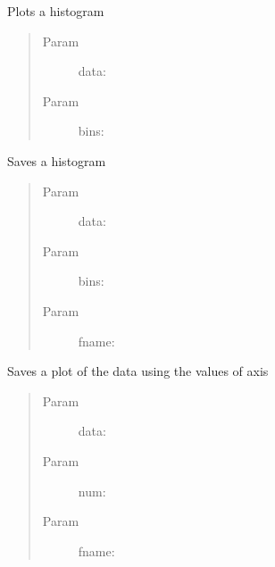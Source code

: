 \documentclass[letterpaper,10pt,english]{sphinxmanual}
\begin{document}

\begin{fulllineitems}
\label{index:SuperHubPlot.plotHisto}
Plots a histogram
\begin{quote}\begin{description}
\item[{Param }] \leavevmode
data:

\item[{Param }] \leavevmode
bins:

\end{description}\end{quote}

\end{fulllineitems}


\begin{fulllineitems}
\label{index:SuperHubPlot.saveHisto}
Saves a histogram
\begin{quote}\begin{description}
\item[{Param }] \leavevmode
data:

\item[{Param }] \leavevmode
bins:

\item[{Param }] \leavevmode
fname:

\end{description}\end{quote}

\end{fulllineitems}


\begin{fulllineitems}
\label{index:SuperHubPlot.savePlot}
Saves a plot of the data using the values of axis
\begin{quote}\begin{description}
\item[{Param }] \leavevmode
data:

\item[{Param }] \leavevmode
num:

\item[{Param }] \leavevmode
fname:

\end{description}\end{quote}

\end{fulllineitems}
\end{document}
